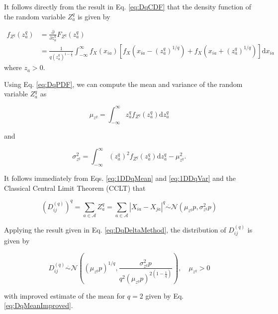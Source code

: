 \documentclass[10pt,letterpaper]{article}\usepackage[]{graphicx}\usepackage[]{color}
\begin{document}
It follows directly from the result in Eq. \ref{eq:DqCDF} that the density function of the random variable $Z^q_a$ is given by

\begin{equation}\label{eq:DqPDF}
\begin{aligned}
f_{Z^q}(z^q_a) &= \frac{\partial}{\partial z^q_a} F_{Z^q}(z^q_a) \\
&= \frac{1}{q \left(z^q_a\right)^{1 - \frac{1}{q}}}\int_{-\infty}^{\infty} f_X(x_{ia})\left[f_X\left(x_{ia} - \left(z^q_a\right)^{1/q}\right) + f_X\left(x_{ia} + \left(z^q_a\right)^{1/q}\right)\right] \text{d}x_{ia}
\end{aligned}
\end{equation}
\noindent where $z_a > 0$.

Using Eq. \ref{eq:DqPDF}, we can compute the mean and variance of the random variable $Z^q_a$ as

\begin{equation}\label{eq:1DDqMean}
\mu_{z^q} = \int_{-\infty}^{\infty} z^q_a f_{Z^q}(z^q_a) \text{d}z^q_a
\end{equation}

\noindent and 

\begin{equation}\label{eq:1DDqVar}
\sigma^2_{z^q} = \int_{-\infty}^{\infty} \left(z^q_a\right)^2 f_{Z^q}(z^q_a) \text{d}z^q_a - \mu^2_{z^q}.
\end{equation}

It follows immediately from Eqs. \ref{eq:1DDqMean} and \ref{eq:1DDqVar} and the Classical Central Limit Theorem (CCLT) that

\begin{equation}\label{eq:DqDistr}
\left(D^{(q)}_{ij}\right)^q = \sum_{a \in \mathcal{A}} Z^q_a = \sum_{a \in \mathcal{A}} |X_{ia} - X_{ja}|^q \overset{.}{\sim} \mathcal{N}\left(\mu_{z^q}p,\sigma^2_{z^q}p\right)
\end{equation}

Applying the result given in Eq. \ref{eq:DqDeltaMethod}, the distribution of $D^{(q)}_{ij}$ is given by

\begin{equation}\label{eq:DDistr}
D^{(q)}_{ij} \overset{.}{\sim} \mathcal{N}\left(\left(\mu_{z^q}p\right)^{1/q},\frac{\sigma^2_{z^q}p}{q^2\left(\mu_{z^q}p\right)^{2\left(1 - \frac{1}{q}\right)}}\right), \quad \mu_{z^q} > 0
\end{equation}

\noindent with improved estimate of the mean for $q=2$ given by Eq. \ref{eq:DqMeanImproved}.
\end{document}
